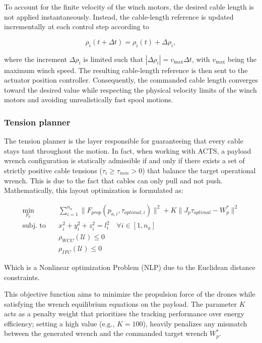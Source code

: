 To account for the finite velocity of the winch motors, the desired cable length is not applied instantaneously. Instead, the cable-length reference is updated incrementally at each control step according to

\begin{equation}
    \rho_i(t+\Delta t)=\rho_i(t)+\Delta\rho_i,
\end{equation}

where the increment $\Delta\rho_i$ is limited such that $|\Delta\rho_i| = v_{\max}\Delta t$, with $v_{\max}$ being the maximum winch speed. The resulting cable-length reference is then sent to the actuator position controller. Consequently, the commanded cable length converges toward the desired value while respecting the physical velocity limits of the winch motors and avoiding unrealistically fast spool motions.

\subsubsection{Tension planner}
The tension planner is the layer responsible for guaranteeing that every cable stays taut throughout the motion. In fact, when working with ACTS, a payload wrench configuration is statically admissible if and only if there exists a set of strictly positive cable tensions ($\tau_i \ge \tau_{min} > 0$) that balance the target operational wrench. This is due to the fact that cables can only pull and not push. Mathematically, this layout optimization is formulated as:

 \begin{equation}
    \begin{aligned}
    \min_{p_a} \quad & \sum_{i=1}^{n_a}\|F_{prop}(p_{a, i}, \tau_{optimal, i})\|^2 + K \|J_p \tau_{optimal} -W_p^*\|^2\\
    \text{subj. to} \quad
    & x_i^2 + y_i^2 + z_i^2 = l_i^2 \quad \forall i \in [1, n_a]\\
    & \rho_{WCC}(\mathcal{U})\le 0\\
    & \rho_{IFC}(\mathcal{U})\le 0
    \end{aligned}
\end{equation} 

Which is a Nonlinear optimization Problem (NLP) due to the Euclidean distance constraints. %

This objective function aims to minimize the propulsion force of the drones while satisfying the wrench equilibrium equations on the payload. The parameter $K$ acts as a penalty weight that prioritizes the tracking performance over energy efficiency; setting a high value (e.g., $K=100$), heavily penalizes any mismatch between the generated wrench and the commanded target wrench $W_p^*$.

